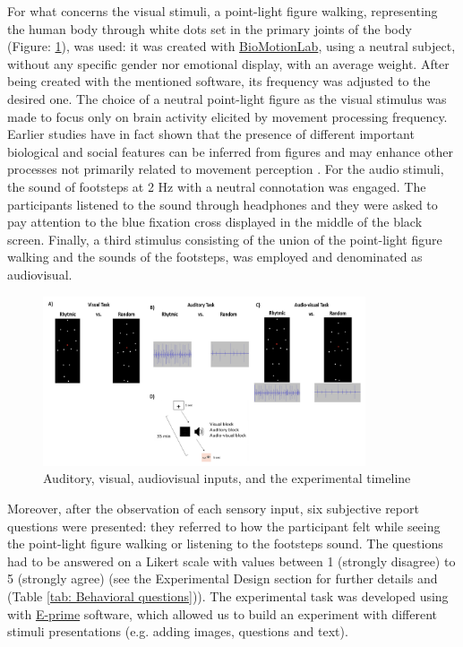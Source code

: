 For what concerns the visual stimuli, a point-light figure walking, representing the human body through white dots set in the primary joints of the body (Figure: \ref{fig: visual stimuli}), was used: it was created with \href{https://www.biomotionlab.ca/html5-bml-walker/}{BioMotionLab}, using a neutral subject, without any specific gender nor emotional display, with an average weight. After being created with the mentioned software, its frequency was adjusted to the desired one. The choice of a neutral point-light figure as the visual stimulus was made to focus only on brain activity elicited by movement processing frequency. Earlier studies have in fact shown that the presence of different important biological and social features can be inferred from figures and may enhance other processes not primarily related to movement perception \parencite{Cracco_2022}. 
For the audio stimuli, the sound of footsteps at 2 Hz with a neutral connotation was engaged. The participants listened to the sound through headphones and they were asked to pay attention to the blue fixation cross displayed in the middle of the black screen. 
Finally, a third stimulus consisting of the union of the point-light figure walking and the sounds of the footsteps, was employed and denominated as audiovisual. 
\begin{figure}[h]
    \centering
        \includegraphics[width=0.85\textwidth]{appendix/Picture 1.png}
        \caption{Auditory, visual, audiovisual inputs, and the experimental timeline}
        \label{fig: visual stimuli}
\end{figure} 
Moreover, after the observation of each sensory input, six subjective report questions were presented: they referred to how the participant felt while seeing the point-light figure walking or listening to the footsteps sound. The questions had to be answered on a Likert scale with values between 1 (strongly disagree) to 5 (strongly agree) (see the Experimental Design section for further details and (Table \ref{tab: Behavioral questions})). 
The experimental task was developed using with \href{https://pstnet.com/products/e-prime/}{E-prime} software, which allowed us to build an experiment with different stimuli presentations (e.g. adding images, questions and text).

